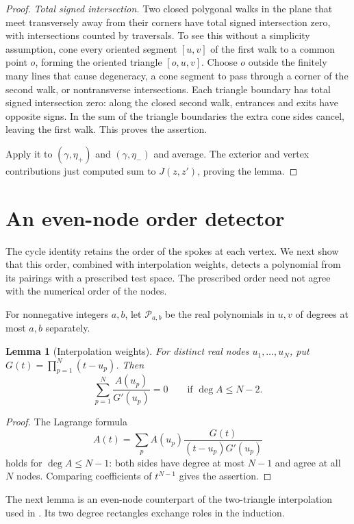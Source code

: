 \documentclass[11pt,a4paper]{article}
\newtheorem{lemma}[theorem]{Lemma}
\theoremstyle{remark}
\numberwithin{equation}{section}
\newcommand{\PP}{\mathcal P}
\begin{document}
\begin{proof}
\emph{Total signed intersection.} Two closed polygonal walks in the plane
that meet transversely away from their corners have total signed
intersection zero, with intersections counted by traversals.
To see this without a simplicity assumption, cone every oriented
segment \([u,v]\) of the first walk to a common point \(o\), forming
the oriented triangle \([o,u,v]\). Choose \(o\) outside the finitely
many lines that cause degeneracy, a cone segment to pass through a
corner of the second walk, or nontransverse intersections.
Each triangle boundary has total signed intersection zero: along
the closed second walk, entrances and exits have opposite signs.
In the sum of the triangle boundaries the extra cone sides cancel,
leaving the first walk. This proves the assertion.

Apply it to \((\gamma,\eta_+)\) and \((\gamma,\eta_-)\) and average.
The exterior and vertex contributions just computed sum to
\(J(z,z')\), proving the lemma.
\end{proof}

\section{An even-node order detector}\label{sec:interpolation}

The cycle identity retains the order of the spokes at each vertex.
We next show that this order, combined with interpolation weights,
detects a polynomial from its pairings with a prescribed test space.
The prescribed order need not agree with the numerical order of the nodes.

For nonnegative integers \(a,b\), let \(\PP_{a,b}\) be the real
polynomials in \(u,v\) of degrees at most \(a,b\) separately.

\begin{lemma}[Interpolation weights]\label{lem:weights}
For distinct real nodes \(u_1,\ldots,u_N\), put
\(G(t)=\prod_{p=1}^{N}(t-u_p)\). Then
\[
\sum_{p=1}^{N}\frac{A(u_p)}{G'(u_p)}=0
\qquad\text{if }\deg A\le N-2.
\]
\end{lemma}

\begin{proof}
The Lagrange formula
\[
A(t)=\sum_p A(u_p)\frac{G(t)}{(t-u_p)G'(u_p)}
\]
holds for \(\deg A\le N-1\): both sides have degree at most \(N-1\)
and agree at all \(N\) nodes. Comparing coefficients of \(t^{N-1}\)
gives the assertion.
\end{proof}

The next lemma is an even-node counterpart of the two-triangle
interpolation used in \cite[Section~4]{BipartiteCompanion}. Its two degree
rectangles exchange roles in the induction.
\end{document}
